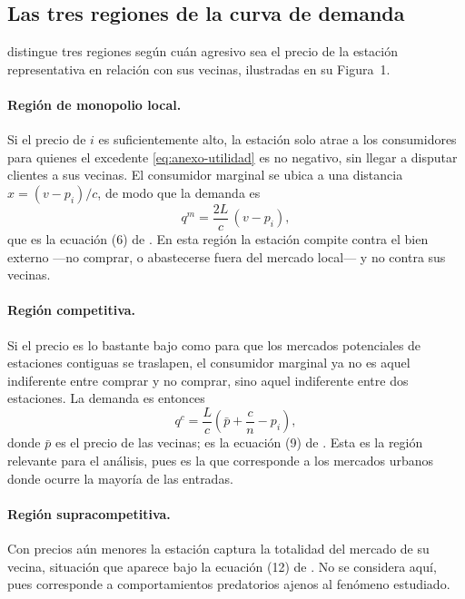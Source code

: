 \subsection{Las tres regiones de la curva de demanda}

\textcite[143--145]{SALOP1979} distingue tres regiones según cuán agresivo sea el
precio de la estación representativa en relación con sus vecinas, ilustradas en
su Figura~1.

\paragraph{Región de monopolio local.} Si el precio de $i$ es suficientemente
alto, la estación solo atrae a los consumidores para quienes el excedente
\eqref{eq:anexo-utilidad} es no negativo, sin llegar a disputar clientes a sus
vecinas. El consumidor marginal se ubica a una distancia $\hat{x}=(v-p_i)/c$, de
modo que la demanda es
\begin{equation}
    q^{m} = \frac{2L}{c}\,(v - p_i) ,
    \label{eq:anexo-qm}
\end{equation}
que es la ecuación (6) de \textcite[143]{SALOP1979}. En esta región la estación
compite contra el bien externo —no comprar, o abastecerse fuera del mercado
local— y no contra sus vecinas.

\paragraph{Región competitiva.} Si el precio es lo bastante bajo como para que
los mercados potenciales de estaciones contiguas se traslapen, el consumidor
marginal ya no es aquel indiferente entre comprar y no comprar, sino aquel
indiferente entre dos estaciones. La demanda es entonces
\begin{equation}
    q^{c} = \frac{L}{c}\left(\bar{p} + \frac{c}{n} - p_i\right) ,
    \label{eq:anexo-qc}
\end{equation}
donde $\bar{p}$ es el precio de las vecinas; es la ecuación (9) de
\textcite[144]{SALOP1979}. Esta es la región relevante para el análisis, pues es
la que corresponde a los mercados urbanos donde ocurre la mayoría de las
entradas.

\paragraph{Región supracompetitiva.} Con precios aún menores la estación captura
la totalidad del mercado de su vecina, situación que aparece bajo la ecuación
(12) de \textcite[145]{SALOP1979}. No se considera aquí, pues corresponde a
comportamientos predatorios ajenos al fenómeno estudiado.

